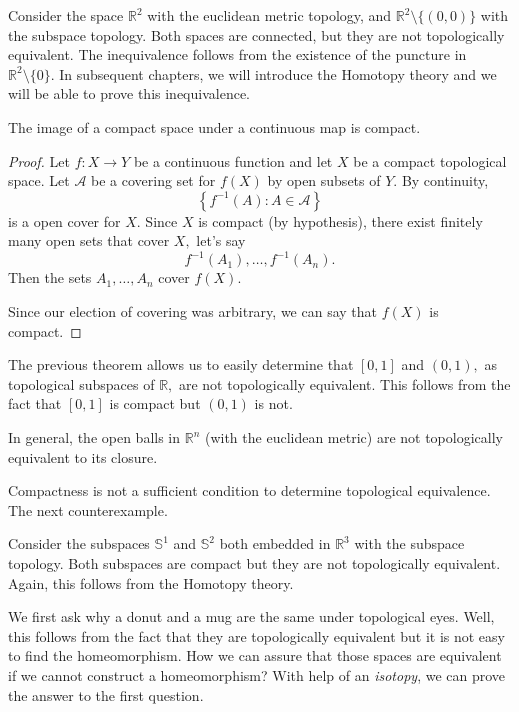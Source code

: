 \documentclass[
	fontsize=10pt, %
	twoside=false, %
	secnumdepth=1, %
]{kaobook}
\begin{document}
\begin{example}
Consider the space $\mathbb{R}^2$ with the euclidean metric topology, and $\mathbb{R}^2\setminus\{(0,0)\}$ with the subspace topology. Both spaces are connected, but they are not topologically equivalent. The inequivalence follows from the existence of the puncture in $\mathbb{R}^2\setminus\{0\}.$ In subsequent chapters, we will introduce the Homotopy theory and we will be able to prove this inequivalence.
\end{example}

\begin{theorem}
The image of a compact space under a continuous map is compact.
\end{theorem}
\begin{proof}
Let $f:X \to Y$ be a continuous function and let $X$ be a compact topological space. Let $\mathcal{A}$ be a covering set for $f(X)$ by open subsets of $Y.$ By continuity, $$\left\{f^{-1}(A):A\in\mathcal{A}\right\}$$ is a open cover for $X.$ Since $X$ is compact (by hypothesis), there exist finitely many open sets that cover $X,$ let's say $$f^{-1}(A_1),\hdots, f^{-1}(A_n).$$ Then the sets $A_1,\hdots, A_n$ cover $f(X).$

Since our election of covering was arbitrary, we can say that $f(X)$ is compact.
\end{proof}

\begin{example}
The previous theorem allows us to easily determine that  $[0,1]$ and  $(0,1),$ as topological subspaces of $\mathbb{R},$ are not topologically equivalent. This follows from the fact that $[0,1]$ is compact but $(0,1)$ is not. 

In general, the open balls in $\mathbb{R}^n$  (with the euclidean metric) are not topologically equivalent to its closure. 
\end{example}


Compactness is not a sufficient condition to determine topological equivalence. The next counterexample.

\begin{example}
Consider the subspaces $\mathbb{S}^1$  and $\mathbb{S}^2$ both embedded in $\mathbb{R}^3$ with the subspace topology. Both subspaces are compact but they are not topologically equivalent. Again, this follows from the Homotopy theory.
\end{example}

We first ask why a donut and a mug are the same under topological eyes. Well, this follows from the fact that they are topologically equivalent but it is not easy to find the homeomorphism. How we can assure that those spaces are equivalent if we cannot construct a homeomorphism? With help of an \emph{isotopy}, we can prove the answer to the first question.
\end{document}
